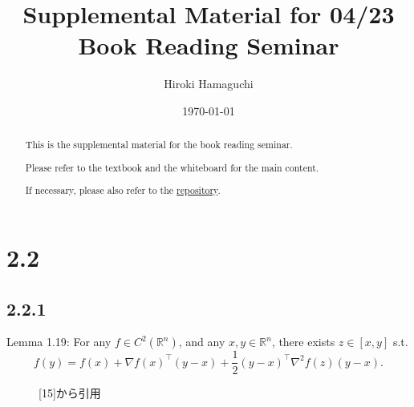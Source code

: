 \documentclass[a4paper, 14pt, dvipdfmx]{extarticle}
\begin{document}
\title{Supplemental Material for 04/23\\Book Reading Seminar}
\author{Hiroki Hamaguchi}
\date{\today}
\maketitle

\begin{abstract}
    \begin{center}
        This is the supplemental material for the book reading seminar.

        Please refer to the textbook and the whiteboard for the main content.

        If necessary, please also refer to the \href{https://github.com/hari64boli64/BookReadingSeminarMaterials}{repository}.
    \end{center}
\end{abstract}

\section*{2.2}

\subsection*{2.2.1}

Lemma 1.19: For any $f \in C^2(\mathbb{R}^n)$,
and any $x, y \in \mathbb{R}^n$,
there exists $z \in [x, y]$ s.t.
\begin{equation*}
    f(y) = f(x) + \nabla f(x)^\top (y - x) + \frac{1}{2} (y - x)^\top \nabla^2 f(z) (y - x).
\end{equation*}

\begin{figure}[H]
    \centering
    \caption{[15]から引用}
\end{figure}
\end{document}
